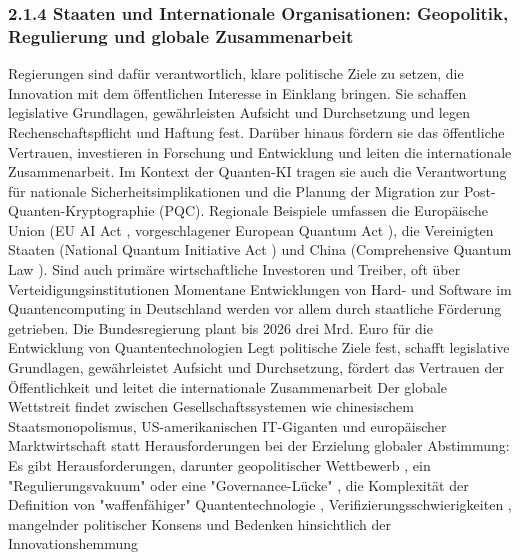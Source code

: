 \subsubsection{2.1.4 Staaten und Internationale Organisationen: Geopolitik, Regulierung und globale Zusammenarbeit}
 Regierungen sind dafür verantwortlich, klare politische Ziele zu setzen, die Innovation mit dem öffentlichen Interesse in Einklang bringen. Sie schaffen legislative Grundlagen, gewährleisten Aufsicht und Durchsetzung und legen Rechenschaftspflicht und Haftung fest. Darüber hinaus fördern sie das öffentliche Vertrauen, investieren in Forschung und Entwicklung und leiten die internationale Zusammenarbeit. Im Kontext der Quanten-KI tragen sie auch die Verantwortung für nationale Sicherheitsimplikationen und die Planung der Migration zur Post-Quanten-Kryptographie (PQC). Regionale Beispiele umfassen die Europäische Union (EU AI Act , vorgeschlagener European Quantum Act ), die Vereinigten Staaten (National Quantum Initiative Act ) und China (Comprehensive Quantum Law ). 
Sind auch primäre wirtschaftliche Investoren und Treiber, oft über Verteidigungsinstitutionen
Momentane Entwicklungen von Hard- und Software im Quantencomputing in Deutschland werden vor allem durch staatliche Förderung getrieben. Die Bundesregierung plant bis 2026 drei Mrd. Euro für die Entwicklung von Quantentechnologien
Legt politische Ziele fest, schafft legislative Grundlagen, gewährleistet Aufsicht und Durchsetzung, fördert das Vertrauen der Öffentlichkeit und leitet die internationale Zusammenarbeit
Der globale Wettstreit findet zwischen Gesellschaftssystemen wie chinesischem Staatsmonopolismus, US-amerikanischen IT-Giganten und europäischer Marktwirtschaft statt
Herausforderungen bei der Erzielung globaler Abstimmung: Es gibt Herausforderungen, darunter geopolitischer Wettbewerb , ein "Regulierungsvakuum" oder eine "Governance-Lücke" , die Komplexität der Definition von "waffenfähiger" Quantentechnologie , Verifizierungsschwierigkeiten , mangelnder politischer Konsens und Bedenken hinsichtlich der Innovationshemmung

